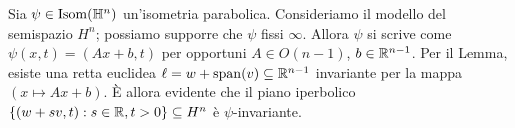 Sia $\psi\in\operatorname{Isom}(\mathbb{H}^n)$ un'isometria parabolica. Consideriamo il modello del semispazio $H^n$; possiamo supporre che $\psi$ fissi $\infty$. Allora $\psi$ si scrive come $\psi(x,t)=(Ax+b,t)$ per opportuni $A\in O(n-1)$, $b\in\mathbb{R}^{n-1}$. Per il Lemma, esiste una retta euclidea $\ell=w+\operatorname{span}(v)\subseteq\mathbb{R}^{n-1}$ invariante per la mappa $(x\mapsto Ax+b)$. È allora evidente che il piano iperbolico $\{(w+sv,t):s\in\mathbb{R},t>0\}\subseteq H^n$ è $\psi$-invariante.